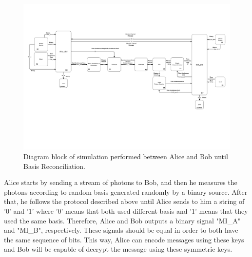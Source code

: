 \begin{figure}[h]
    \centering
        \includegraphics[clip=true, trim=0.5cm 5.0cm 0cm 2.5cm, width=1.10\textwidth]{./sdf/bb84_with_discrete_variables/figures_raw/Simulation_toplevel_bb84.pdf}
    \caption{Diagram block of simulation performed between Alice and Bob until Basis Reconciliation. }\label{toplevelalicebob}
\end{figure}

Alice starts by sending a stream of photons to Bob, and then he measures the photons according to random basis generated randomly by a binary source. After that, he follows the protocol described above until Alice sends to him a string of '0' and '1' where '0' means that both used different basis and '1' means that they used the same basis. Therefore, Alice and Bob outputs a binary signal "MI\_A" and "MI\_B", respectively. These signals should be equal in order to both have the same sequence of bits. This way, Alice can encode messages using these keys and Bob will be capable of decrypt the message using these symmetric keys.

